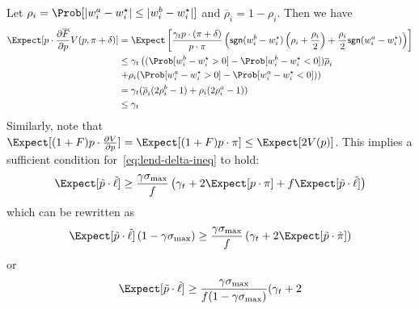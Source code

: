 Let $\rho_i = \Prob[|w_i^a-w_i^{\star}| \leq |w_i^b - w_i^{\star}|]$ and $\overline{\rho}_i = 1-\rho_i$.
Then we have
\begin{align*}
 \Expect[p\cdot \frac{\partial \overline{F}}{\partial p} V(p, \pi+\delta)] &= \Expect\left[\frac{\gamma_t p\cdot(\pi+\delta)}{p \cdot \pi}\left(\mathsf{sgn}(w_i^b-w_i^{\star})\left(\rho_i + \frac{\rho_i}{2}\right) + \frac{\rho_i}{2}\mathsf{sgn}(w_i^a-w_i^{\star}) \right)\right] \\
              &\leq \gamma_t\left((\Prob[w_i^b - w_i^{\star} > 0] - \Prob[w_i^b-w_i^{\star} < 0])\overline{\rho}_i \right. \\
              &\left.+ \rho_i(\Prob[w_i^a-w_i^{\star} > 0] - \Prob[w_i^a - w_i^{\star}<0])\right) \\
              &= \gamma_t(\overline{\rho}_i(2\rho^b_i - 1) + \rho_i(2\rho^a_i -1)) \\ 
              &\leq \gamma_t
\end{align*}
Similarly, note that $\Expect[(1+F)p \cdot\frac{\partial V}{\partial p}] = \Expect[(1+F) p\cdot \pi] \leq \Expect[2 V(p)]$.
This implies a sufficient condition for~\eqref{eq:lend-delta-ineq} to hold:
\[
\Expect[\tilde{p}\cdot \tilde{\ell}] \geq \frac{\gamma \sigma_{\max}}{f}\left(\gamma_t + 2\Expect[p\cdot\pi] + f\Expect[\tilde{p}\cdot\tilde{\ell}]\right)
\]
which can be rewritten as
\[
    \Expect[\tilde{p}\cdot\tilde{\ell}] \left(1 - \gamma\sigma_{\max}\right) \geq \frac{\gamma\sigma_{\max}}{f} \left(\gamma_t + 2 \Expect[\tilde{p}\cdot\tilde{\pi}]\right) 
\]
or
\[
    \Expect[\tilde{p}\cdot\tilde{\ell}] \geq \frac{\gamma \sigma_{\max}}{f(1-\gamma\sigma_{\max})}(\gamma_t + 2 
\]
